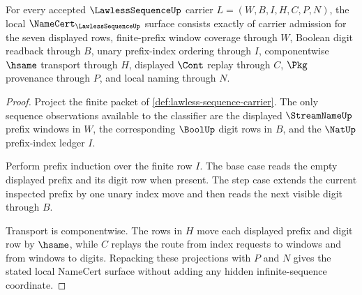 \begin{theorem}
\label{thm:lawless-sequence-namecert-obligations}
For every accepted $\LawlessSequenceUp$ carrier $L=(W,B,I,H,C,P,N)$, the local $\NameCert_{\LawlessSequenceUp}$ surface consists exactly of carrier admission for the seven displayed rows, finite-prefix window coverage through $W$, Boolean digit readback through $B$, unary prefix-index ordering through $I$, componentwise $\hsame$ transport through $H$, displayed $\Cont$ replay through $C$, $\Pkg$ provenance through $P$, and local naming through $N$.
\end{theorem}
\begin{proof}
Project the finite packet of \autoref{def:lawless-sequence-carrier}. The only sequence observations available to the classifier are the displayed $\StreamNameUp$ prefix windows in $W$, the corresponding $\BoolUp$ digit rows in $B$, and the $\NatUp$ prefix-index ledger $I$.

Perform prefix induction over the finite row $I$. The base case reads the empty displayed prefix and its digit row when present. The step case extends the current inspected prefix by one unary index move and then reads the next visible digit through $B$.

Transport is componentwise. The rows in $H$ move each displayed prefix and digit row by $\hsame$, while $C$ replays the route from index requests to windows and from windows to digits. Repacking these projections with $P$ and $N$ gives the stated local NameCert surface without adding any hidden infinite-sequence coordinate.
\end{proof}

